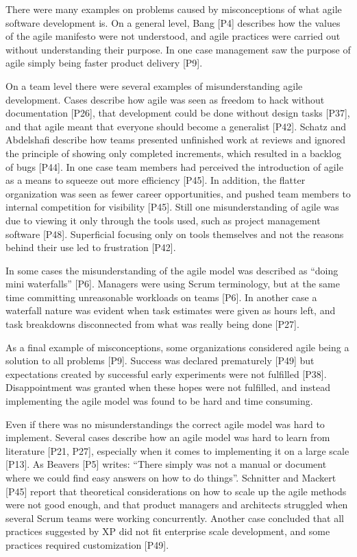 \documentclass[preprint,authoryear,12pt]{elsarticle}
\begin{document}

There were many examples on problems caused by misconceptions of what agile
software development is. On a general level, Bang [P4] describes how the values
of the agile manifesto were not understood, and agile practices were carried out
without understanding their purpose. In one case management saw the purpose of
agile simply being faster product delivery [P9].

On a team level there were several examples of misunderstanding agile
development. Cases describe how agile was seen as freedom to hack without
documentation [P26], that development could be done without design tasks [P37],
and that agile meant that everyone should become a generalist [P42]. Schatz and
Abdelshafi describe how teams presented unfinished work at reviews and ignored
the principle of showing only completed increments, which resulted in a backlog
of bugs [P44]. In one case team members had perceived the introduction of agile
as a means to squeeze out more efficiency [P45]. In addition, the flatter
organization was seen as fewer career opportunities, and pushed team members to
internal competition for visibility [P45].
Still one misunderstanding of agile was due to viewing it only through the tools
used, such as project management software [P48]. Superficial focusing only on
tools themselves and not the reasons behind their use led to frustration [P42].

In some cases the misunderstanding of the agile model was described as ``doing
mini waterfalls'' [P6]. Managers were using Scrum terminology, but at the same
time committing unreasonable workloads on teams [P6]. In another case a
waterfall nature was evident when task estimates were given as hours left, and
task breakdowns disconnected from what was really being done [P27].

As a final example of misconceptions, some organizations considered agile being
a solution to all problems [P9]. Success was declared prematurely [P49] but
expectations created by successful early experiments were not fulfilled [P38].
Disappointment was granted when these hopes were not fulfilled, and instead
implementing the agile model was found to be hard and time consuming.


Even if there was no misunderstandings the correct agile model was hard to
implement. Several cases describe how an agile model was hard to learn from
literature [P21, P27], especially when it comes to implementing it on a large
scale [P13]. As Beavers [P5] writes: ``There simply was not a manual or document
where we could find easy answers on how to do things''.
Schnitter and Mackert [P45] report that theoretical considerations on how to
scale up the agile methods were not good enough, and that product managers and
architects struggled when several Scrum teams were working concurrently.
Another case concluded that all practices suggested by XP did not fit enterprise
scale development, and some practices required customization [P49].
\end{document}
